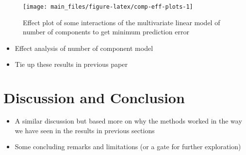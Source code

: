 \documentclass[12pt,3p,authoryear]{elsarticle}
\providecommand{\tightlist}{%
  \setlength{\itemsep}{0pt}\setlength{\parskip}{0pt}}
\begin{document}
\begin{figure}[!htb]
\texttt{[image: main\_files/figure-latex/comp-eff-plots-1]} \caption{Effect plot of some interactions of the multivariate
linear model of number of components to get minimum prediction error}\label{fig:comp-eff-plots}
\end{figure}

\begin{itemize}
\tightlist
\item
  Effect analysis of number of component model
\item
  Tie up these results in previous paper
\end{itemize}

\section{Discussion and Conclusion}\label{discussion-and-conclusion}

\begin{itemize}
\tightlist
\item
  A similar discussion but based more on why the methods worked in the
  way we have seen in the results in previous sections
\item
  Some concluding remarks and limitations (or a gate for further
  exploration)
\end{itemize}


\renewcommand\refname{References}

\end{document}
